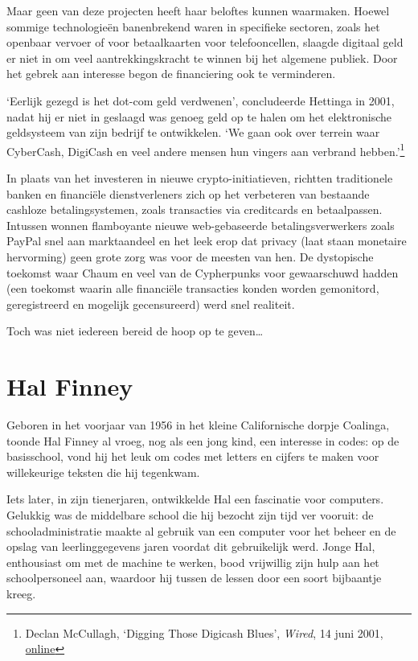\documentclass[
  a5paper,
  smalldemyvopaper,11pt,twoside,onecolumn,openright,extrafontsizes]{memoir}
\begin{document}
Maar geen van deze projecten heeft haar beloftes kunnen waarmaken.
Hoewel sommige technologieën banenbrekend waren in specifieke sectoren,
zoals het openbaar vervoer of voor betaalkaarten voor telefooncellen,
slaagde digitaal geld er niet in om veel aantrekkingskracht te winnen
bij het algemene publiek. Door het gebrek aan interesse begon de
financiering ook te verminderen.

`Eerlijk gezegd is het dot-com geld verdwenen', concludeerde Hettinga in
2001, nadat hij er niet in geslaagd was genoeg geld op te halen om het
elektronische geldsysteem van zijn bedrijf te ontwikkelen. `We gaan ook
over terrein waar CyberCash, DigiCash en veel andere mensen hun vingers
aan verbrand hebben.'\footnote{Declan McCullagh, `Digging Those Digicash
  Blues', \emph{Wired}, 14 juni 2001,
  \href{https://www.wired.com/2001/06/digging-those-digicash-blues/}{online}}

In plaats van het investeren in nieuwe crypto-initiatieven, richtten
traditionele banken en financiële dienstverleners zich op het verbeteren
van bestaande cashloze betalingsystemen, zoals transacties via
creditcards en betaalpassen. Intussen wonnen flamboyante nieuwe
web-gebaseerde betalingsverwerkers zoals PayPal snel aan marktaandeel en
het leek erop dat privacy (laat staan \hspace{0pt}\hspace{0pt}monetaire
hervorming) geen grote zorg was voor de meesten van hen. De dystopische
toekomst waar Chaum en veel van de Cypherpunks voor gewaarschuwd hadden
(een toekomst waarin alle financiële transacties konden worden
gemonitord, geregistreerd en mogelijk gecensureerd) werd snel realiteit.

Toch was niet iedereen bereid de hoop op te geven\ldots{}

\section{Hal Finney}\label{hal-finney}

Geboren in het voorjaar van 1956 in het kleine Californische dorpje
Coalinga, toonde Hal Finney al vroeg, nog als een jong kind, een
interesse in codes: op de basisschool, vond hij het leuk om codes met
letters en cijfers te maken voor willekeurige teksten die hij tegenkwam.

Iets later, in zijn tienerjaren, ontwikkelde Hal een fascinatie voor
computers. Gelukkig was de middelbare school die hij bezocht zijn tijd
ver vooruit: de schooladministratie maakte al gebruik van een computer
voor het beheer en de opslag van leerlinggegevens jaren voordat dit
gebruikelijk werd. Jonge Hal, enthousiast om met de machine te werken,
bood vrijwillig zijn hulp aan het schoolpersoneel aan, waardoor hij
tussen de lessen door een soort bijbaantje kreeg.
\end{document}
